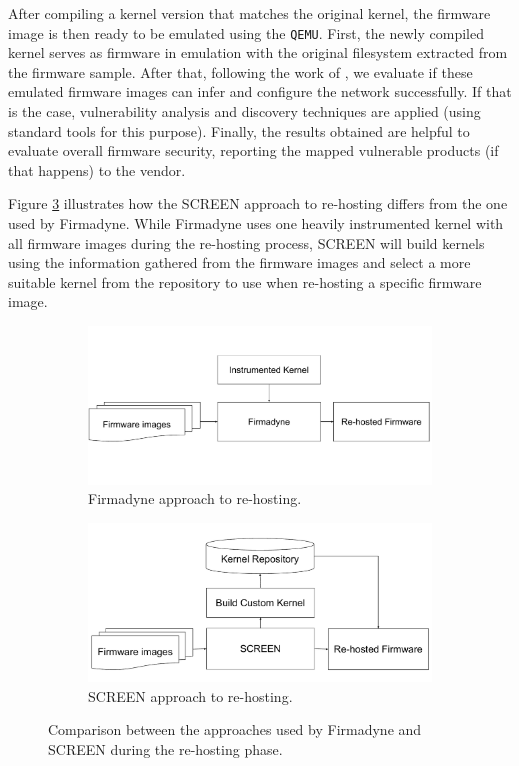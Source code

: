 After compiling a kernel version that matches the original kernel, the firmware image is then ready to be emulated using the {\tt QEMU}. First, the newly compiled kernel serves as firmware in emulation with the original filesystem extracted from the firmware sample. After that, following the work of \cite{firmadyne}, we evaluate if these emulated firmware images can infer and configure the network successfully. If that is the case, vulnerability analysis and discovery techniques are applied (using standard tools for this purpose). Finally, the results obtained are helpful to evaluate overall firmware security, reporting the mapped vulnerable products (if that happens) to the vendor.

Figure \ref{fig:firmadyne-screen-compare} illustrates how the SCREEN approach to re-hosting differs from the one used by Firmadyne. While Firmadyne uses one heavily instrumented kernel with all firmware images during the re-hosting process, SCREEN will build kernels using the information gathered from the firmware images and select a more suitable kernel from the repository to use when re-hosting a specific firmware image.

\begin{figure}[h]
     \centering
     \begin{subfigure}[b]{0.45\textwidth}
         \centering
         \includegraphics[width=\textwidth]{figs/Firmadyne-Approach.pdf}
         \caption{Firmadyne approach to re-hosting.}
         \label{fig:firmadyne-approach}
     \end{subfigure}
     \hfill
     \begin{subfigure}[b]{0.45\textwidth}
         \centering
         \includegraphics[width=\textwidth]{figs/SCREEN-Approach.pdf}
         \caption{SCREEN approach to re-hosting.}
         \label{fig:screen-approach}
     \end{subfigure}
        \caption{Comparison between the approaches used by Firmadyne and SCREEN during the re-hosting phase.}
        \label{fig:firmadyne-screen-compare}
\end{figure}

